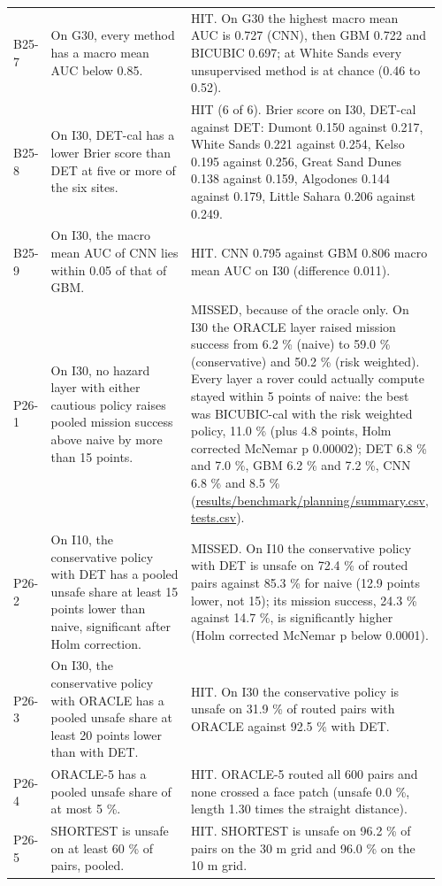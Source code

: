 \documentclass[10pt]{article}
\begin{document}
\begin{longtable}{@{}p{0.08\linewidth}p{0.42\linewidth}p{0.46\linewidth}@{}}
B25-7 & On G30, every method has a macro mean AUC below 0.85. & HIT. On G30 the highest macro mean AUC is 0.727 (CNN), then GBM 0.722 and BICUBIC 0.697; at White Sands every unsupervised method is at chance (0.46 to 0.52). \\
B25-8 & On I30, DET-cal has a lower Brier score than DET at five or more of the six sites. & HIT (6 of 6). Brier score on I30, DET-cal against DET: Dumont 0.150 against 0.217, White Sands 0.221 against 0.254, Kelso 0.195 against 0.256, Great Sand Dunes 0.138 against 0.159, Algodones 0.144 against 0.179, Little Sahara 0.206 against 0.249. \\
B25-9 & On I30, the macro mean AUC of CNN lies within 0.05 of that of GBM. & HIT. CNN 0.795 against GBM 0.806 macro mean AUC on I30 (difference 0.011). \\
P26-1 & On I30, no hazard layer with either cautious policy raises pooled mission success above naive by more than 15 points. & MISSED, because of the oracle only. On I30 the ORACLE layer raised mission success from 6.2 \% (naive) to 59.0 \% (conservative) and 50.2 \% (risk weighted). Every layer a rover could actually compute stayed within 5 points of naive: the best was BICUBIC-cal with the risk weighted policy, 11.0 \% (plus 4.8 points, Holm corrected McNemar p 0.00002); DET 6.8 \% and 7.0 \%, GBM 6.2 \% and 7.2 \%, CNN 6.8 \% and 8.5 \% (\url{results/benchmark/planning/summary.csv}, \url{tests.csv}). \\
P26-2 & On I10, the conservative policy with DET has a pooled unsafe share at least 15 points lower than naive, significant after Holm correction. & MISSED. On I10 the conservative policy with DET is unsafe on 72.4 \% of routed pairs against 85.3 \% for naive (12.9 points lower, not 15); its mission success, 24.3 \% against 14.7 \%, is significantly higher (Holm corrected McNemar p below 0.0001). \\
P26-3 & On I30, the conservative policy with ORACLE has a pooled unsafe share at least 20 points lower than with DET. & HIT. On I30 the conservative policy is unsafe on 31.9 \% of routed pairs with ORACLE against 92.5 \% with DET. \\
P26-4 & ORACLE-5 has a pooled unsafe share of at most 5 \%. & HIT. ORACLE-5 routed all 600 pairs and none crossed a face patch (unsafe 0.0 \%, length 1.30 times the straight distance). \\
P26-5 & SHORTEST is unsafe on at least 60 \% of pairs, pooled. & HIT. SHORTEST is unsafe on 96.2 \% of pairs on the 30 m grid and 96.0 \% on the 10 m grid. \\

\end{longtable}
\end{document}
